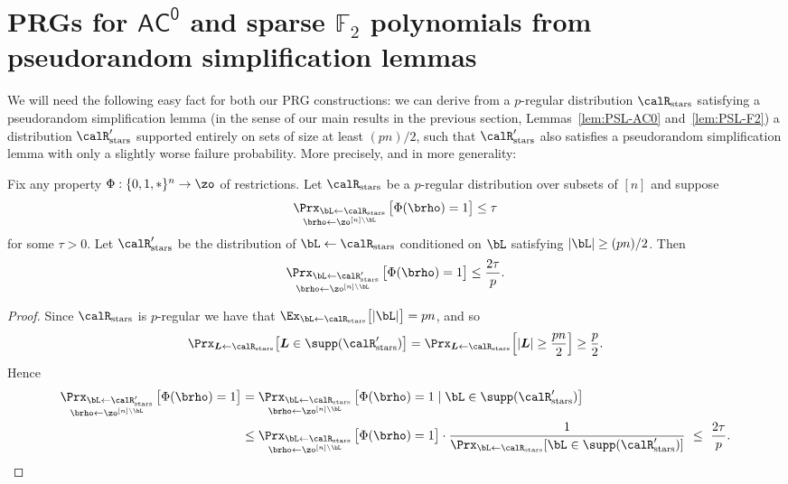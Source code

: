 \documentclass{toc}
\theoremstyle{plain}
\newcommand{\acz}{\mathsf{AC^0}}
\newcommand{\stars}{\mathrm{stars}}
\renewcommand{\F}{\mathds{F}}
\begin{document}
\section{PRGs for $\acz$ and sparse $\F_2$ polynomials from pseudorandom simplification lemmas} \label{sec:puttogether}

We will need the following easy fact for both our PRG constructions: we can derive from a $p$-regular distribution $\calR_\stars$ satisfying a pseudorandom simplification lemma (in the sense of our main results in the previous section, Lemmas~\ref{lem:PSL-AC0} and~\ref{lem:PSL-F2}) a distribution $\calR_\stars'$ supported entirely on sets of size at least $(pn)/2$, such that $\calR_\stars'$ also satisfies a pseudorandom simplification lemma with only a slightly worse failure probability.  More precisely, and in more generality:

\begin{proposition}
\label{prop:condition} 
Fix any property $\Phi : \{0,1,\ast\}^n \to \zo$ of restrictions. 
Let $\calR_\stars$ be a $p$-regular distribution over subsets of $[n]$ and suppose  
\[ \mathop{\Prx_{\bL\leftarrow\calR_\stars}}_{\brho\leftarrow\zo^{[n]\setminus \bL}} \big[ \Phi(\brho) = 1 \big] \le \tau \]
for some $\tau > 0$.   Let $\calR_\stars'$ be the distribution of $\bL\leftarrow\calR_\stars$ conditioned on $\bL$ satisfying $|\bL| \ge (pn)/2$. Then 
\[ \mathop{\Prx_{\bL\leftarrow\calR_\stars'}}_{\brho\leftarrow\zo^{[n]\setminus \bL}} \big[ \Phi(\brho) = 1 \big] \le \frac{2\tau}{p}. \]
 \end{proposition} 

\begin{proof} 
Since $\calR_\stars$ is $p$-regular we have that $\Ex_{\bL\leftarrow\calR_\stars} \big[|\bL|\big] = pn$, and so
\[ \Prx_{\boldsymbol{L}\leftarrow\calR_\stars}\big[\boldsymbol{L} \in \supp(\calR_\stars')\big]  = \Prx_{\boldsymbol{L}\leftarrow\calR_\stars}\Big[|\boldsymbol{L}| \ge \frac{pn}{2}\Big] \ge \frac{p}{2}.\] 
Hence 
\begin{align*}
 \mathop{\Prx_{\bL\leftarrow\calR_\stars'}}_{\brho\leftarrow\zo^{[n]\setminus \bL}}\big[\Phi(\brho)=1\big]  
& =  \mathop{\Prx_{\bL\leftarrow\calR_\stars}}_{\brho\leftarrow\zo^{[n]\setminus \bL}}\big[\Phi(\brho)=1 \mid \bL \in\supp(\calR_\stars')\big]  \\
& \le  \mathop{\Prx_{\bL\leftarrow\calR_\stars}}_{\brho\leftarrow\zo^{[n]\setminus \bL}}\big[\Phi(\brho)=1\big] \cdot  \frac1{\Prx_{\bL\leftarrow\calR_\stars}[\bL \in \supp(\calR_\stars')]} \ \le \ \frac{2\tau}{p}. \qedhere
\end{align*}
\end{proof} 
\end{document}
